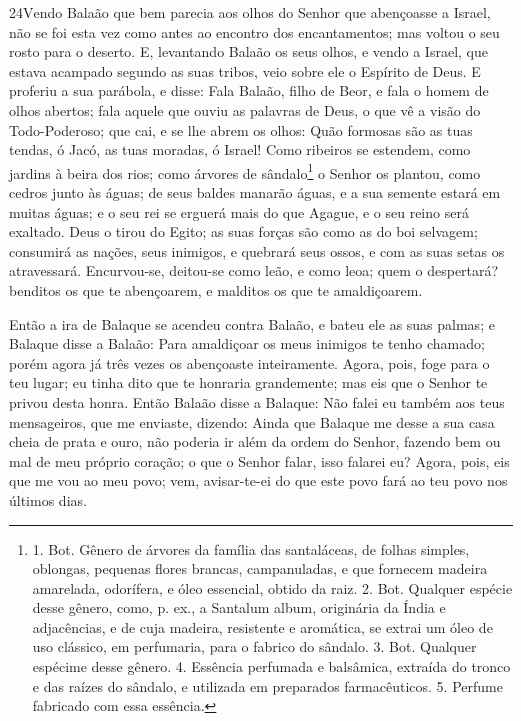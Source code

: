 \lettrine{24} Vendo Balaão que bem parecia aos olhos do Senhor
que abençoasse a Israel, não se foi esta vez como antes ao encontro
dos encantamentos; mas voltou o seu rosto para o deserto. E,
levantando Balaão os seus olhos, e vendo a Israel, que estava
acampado segundo as suas tribos, veio sobre ele o Espírito de Deus.
E proferiu a sua parábola, e disse: Fala Balaão, filho de Beor,
e fala o homem de olhos abertos; fala aquele que ouviu as
palavras de Deus, o que vê a visão do Todo-Poderoso; que cai, e se
lhe abrem os olhos: Quão formosas são as tuas tendas, ó Jacó, as
tuas moradas, ó Israel! Como ribeiros se estendem, como jardins
à beira dos rios; como árvores de sândalo\footnote{1. Bot. Gênero de
árvores da família das santaláceas, de folhas simples, oblongas,
pequenas flores brancas, campanuladas, e que fornecem madeira
amarelada, odorífera, e óleo essencial, obtido da raiz. 2. Bot.
Qualquer espécie desse gênero, como, p. ex., a Santalum album,
originária da Índia e adjacências, e de cuja madeira, resistente e
aromática, se extrai um óleo de uso clássico, em perfumaria, para o
fabrico do sândalo. 3. Bot. Qualquer espécime desse gênero. 4.
Essência perfumada e balsâmica, extraída do tronco e das raízes do
sândalo, e utilizada em preparados farmacêuticos. 5. Perfume
fabricado com essa essência.} o Senhor os plantou, como cedros junto
às águas; de seus baldes manarão águas, e a sua semente estará
em muitas águas; e o seu rei se erguerá mais do que Agague, e o seu
reino será exaltado. Deus o tirou do Egito; as suas forças são
como as do boi selvagem; consumirá as nações, seus inimigos, e
quebrará seus ossos, e com as suas setas os atravessará.
Encurvou-se, deitou-se como leão, e como leoa; quem o
despertará? benditos os que te abençoarem, e malditos os que te
amaldiçoarem.

Então a ira de Balaque se acendeu contra Balaão, e bateu ele as
suas palmas; e Balaque disse a Balaão: Para amaldiçoar os meus
inimigos te tenho chamado; porém agora já três vezes os abençoaste
inteiramente. Agora, pois, foge para o teu lugar; eu tinha
dito que te honraria grandemente; mas eis que o Senhor te privou
desta honra. Então Balaão disse a Balaque: Não falei eu
também aos teus mensageiros, que me enviaste, dizendo: Ainda
que Balaque me desse a sua casa cheia de prata e ouro, não poderia
ir além da ordem do Senhor, fazendo bem ou mal de meu próprio
coração; o que o Senhor falar, isso falarei eu? Agora, pois,
eis que me vou ao meu povo; vem, avisar-te-ei do que este povo fará
ao teu povo nos últimos dias.

